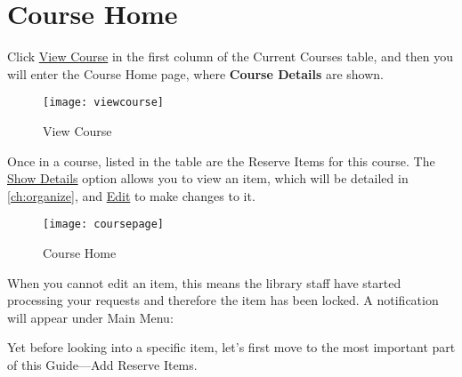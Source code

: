 \section{Course Home}
\label{sec: course page}
Click \uline{View Course} in the first column of the Current Courses table, and then you will enter the Course Home page, where \textbf{Course Details} are shown.

\vspace*{3ex}
\begin{figure}[h]
    \centering
    \texttt{[image: viewcourse]}
    \caption{View Course}
    \label{fig:view course}
\end{figure}
\vspace*{2ex}

Once in a course, listed in the table are the {\imp Reserve Items} for this course. The \uline{Show Details} option allows you to view an item, which will be detailed in \autoref{ch:organize}, and \uline{Edit} to make changes to it.

\vspace*{3ex}
\begin{figure}[h]
    \centering
    \texttt{[image: coursepage]}
    \caption{Course Home}
    \label{fig:course home}
\end{figure}
\vspace*{6ex}

\begin{notebox}
    When you cannot edit an item, this means the library staff have started processing your requests and therefore the item has been locked. A notification will appear under {\imp Main Menu}: 
    \tcblower
    \label{note: notedit}
\end{notebox}
\vspace*{3ex}


Yet before looking into a specific item, let's first move to the most important part of this Guide---{\imp Add Reserve Items}.